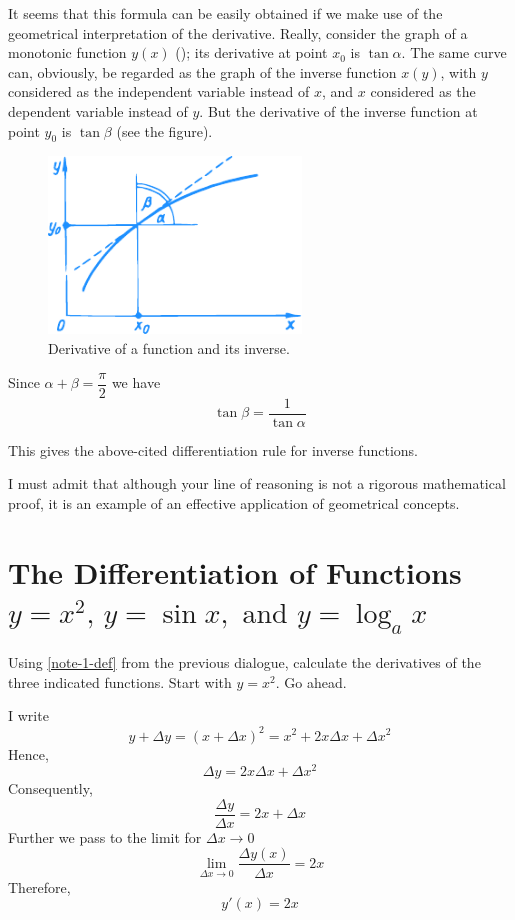 \rdr It seems that this formula can be easily obtained if we make use of the geometrical interpretation of the derivative. Really, consider the graph of a monotonic function $y (x)$ (); its derivative at point $x_{0}$ is $\tan \alpha$. The same curve can, obviously, be regarded as the graph of the inverse function $x (y)$, with $y$ considered as the independent variable instead of $x$, and $x$ considered as the dependent variable instead of $y$. But the derivative of the inverse function at point $y_{0}$ is $\tan \beta$ (see the figure). 
\begin{figure}[!ht]%
\centering
\includegraphics[width=0.6\textwidth]{figures/fig-41.pdf}
\caption{Derivative of a function and its inverse.}
\label{fig-41}
\end{figure}
Since $\alpha + \beta = \dfrac{\pi}{2}$ we have
\begin{equation*}%
\tan \beta = \frac{1}{\tan \alpha}
\end{equation*}

This gives the above-cited differentiation rule for inverse functions.

\athr I must admit that although your line of reasoning is not a rigorous mathematical proof, it is an example of an effective application of geometrical concepts.
\section*{The Differentiation of Functions \\
$y = x^{2}, \, y= \sin x, \, \, \text{and} \,\, y = \log_{a} x$}

\athr Using \eqref{note-1-def} from the previous dialogue, calculate the derivatives of the three indicated functions. Start with $y = x^{2}$. Go ahead.

\rdr I write
\begin{equation*}%
y + \Delta y = (x + \Delta x)^{2} = x^{2} + 2x	\Delta x + \Delta x^{2}
\end{equation*}
Hence, 
\begin{equation*}%
\Delta y =  2x	\Delta x + \Delta x^{2}
\end{equation*}
Consequently,
\begin{equation*}%
\frac{\Delta y}{\Delta x} =  2x	 + \Delta x
\end{equation*}
Further we pass to the limit for $\Delta x \to 0$
\begin{equation*}%
\lim\limits_{\Delta x \to 0} \frac{\Delta y (x)}{\Delta x} =  2x	
\end{equation*}
Therefore,
\begin{equation*}%
y' (x) = 2x
\end{equation*}

